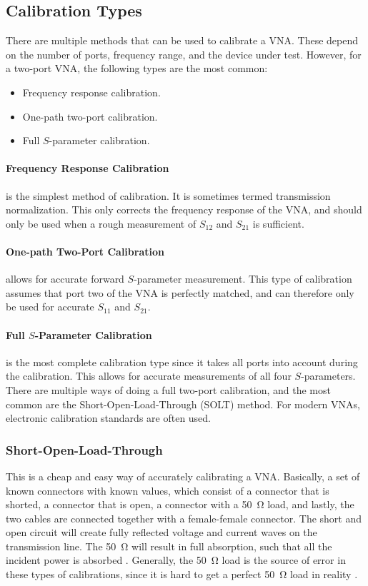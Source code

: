 \subsection{Calibration Types}
There are multiple methods that can be used to calibrate a VNA. These depend on the number of ports, frequency range, and the device under test. However, for a two-port VNA, the following types are the most common:
\begin{itemize}
\item Frequency response calibration.
\item One-path two-port calibration.
\item Full $S$-parameter calibration.
\end{itemize}

\paragraph{Frequency Response Calibration} is the simplest method of calibration. It is sometimes termed transmission normalization. This only corrects the frequency response of the VNA, and should only be used when a rough measurement of $S_{12}$ and  $S_{21}$ is sufficient.
 
\paragraph{One-path Two-Port Calibration} allows for accurate forward $S$-parameter measurement. This type of calibration assumes that port two of the VNA is perfectly matched, and can therefore only be used for accurate $S_{11}$ and $S_{21}$.

\paragraph{Full $S$-Parameter Calibration} is the most complete calibration type since it takes all ports into account during the calibration. This allows for accurate measurements of all four $S$-parameters. There are multiple ways of doing a full two-port calibration, and the most common are the Short-Open-Load-Through (SOLT) method. For modern VNAs, electronic calibration standards are often used. 

\subsubsection{Short-Open-Load-Through}
This is a cheap and easy way of accurately calibrating a VNA. Basically, a set of known connectors with known values, which consist of a connector that is shorted, a connector that is open, a connector with a \SI{50}{\ohm} load, and lastly, the two cables are connected together with a female-female connector. The short and open circuit will create fully reflected voltage and current waves on the transmission line. The \SI{50}{\ohm} will result in full absorption, such that all the incident power is absorbed \cite{agilentAppNoteVNA}. Generally, the \SI{50}{\ohm} load is the source of error in these types of calibrations, since it is hard to get a perfect \SI{50}{\ohm} load in reality \cite{nationalInstruVNA}. 

